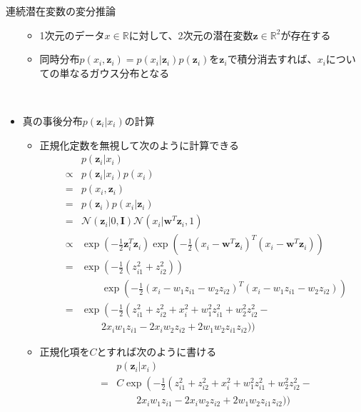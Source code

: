 \documentclass[dvipdfmx,notheorems,t]{beamer}
\begin{document}
\begin{frame}{連続潜在変数の変分推論}
\begin{itemize}
\begin{itemize}
		\item \alert{1次元}のデータ$x \in \mathbb{R}$に対して、\alert{2次元}の潜在変数$\bm{z} \in \mathbb{R}^2$が存在する
		\item 同時分布$p(x_i, \bm{z}_i) = p(x_i | \bm{z}_i) p(\bm{z}_i)$を$\bm{z}_i$で積分消去すれば、$x_i$についての単なるガウス分布となる
	\end{itemize} \
	
	\item 真の事後分布$p(\bm{z}_i | x_i)$の計算
	\begin{itemize}
		\item 正規化定数を無視して次のように計算できる
		\begin{eqnarray}
			&& p(\bm{z}_i | x_i) \nonumber \\
			&\propto& p(\bm{z}_i | x_i) p(x_i) \nonumber \\
			&=& p(x_i, \bm{z}_i) \nonumber \\
			&=& p(\bm{z}_i) p(x_i | \bm{z}_i) \nonumber \\
			&=& \mathcal{N}(\bm{z}_i | 0, \bm{I}) \mathcal{N}(x_i | \bm{w}^T \bm{z}_i, 1) \nonumber \\
			&\propto& \exp \left( -\frac{1}{2} \bm{z}_i^T \bm{z}_i \right) \exp \left( -\frac{1}{2} \left( x_i - \bm{w}^T \bm{z}_i \right)^T \left( x_i - \bm{w}^T \bm{z}_i \right) \right) \nonumber \\
			&=& \exp \left( -\frac{1}{2} \left( z_{i1}^2 + z_{i2}^2 \right) \right) \nonumber \\
			&& \qquad \exp \left( -\frac{1}{2} \left( x_i - w_1 z_{i1} - w_2 z_{i2} \right)^T \left( x_i - w_1 z_{i1} - w_2 z_{i2} \right) \right) \nonumber \\
			&=& \exp \left( -\frac{1}{2} \left( z_{i1}^2 + z_{i2}^2 + x_i^2 + w_1^2 z_{i1}^2 + w_2^2 z_{i2}^2 - \right. \right. \nonumber \\
			&& \qquad 2 x_i w_1 z_{i1} - 2 x_i w_2 z_{i2} + 2 w_1 w_2 z_{i1} z_{i2} \big) \bigg)
		\end{eqnarray}
		
		\item 正規化項を$C$とすれば次のように書ける
		\begin{eqnarray}
			&& p(\bm{z}_i | x_i) \nonumber \\
			&=& C \exp \left( -\frac{1}{2} \left( z_{i1}^2 + z_{i2}^2 + x_i^2 + w_1^2 z_{i1}^2 + w_2^2 z_{i2}^2 - \right. \right. \nonumber \\
			&& \qquad 2 x_i w_1 z_{i1} - 2 x_i w_2 z_{i2} + 2 w_1 w_2 z_{i1} z_{i2} \big) \bigg)
		\end{eqnarray}
		

\end{itemize}
\end{itemize}
\end{frame}
\end{document}
